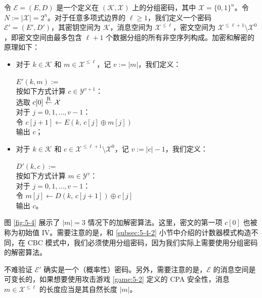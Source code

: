 令 $\mathcal{E}=(E,D)$ 是一个定义在 $(\mathcal{K},\mathcal{X})$ 上的分组密码，其中 $\mathcal{X}=\{0,1\}^n$。令 $N:=|\mathcal{X}|=2^n$。对于任意多项式边界的 $\ell\geq1$，我们定义一个密码 $\mathcal{E}'=(E',D')$，其密钥空间为 $\mathcal{K}$，消息空间为 $\mathcal{X}^{\leq\ell}$，密文空间为 $\mathcal{X}^{\leq\ell+1}\setminus\mathcal{X}^0$，即密文空间由最多包含 $\ell+1$ 个数据分组的所有非空序列构成。加密和解密的原理如下：
\begin{itemize}
	\item 对于 $k\in\mathcal{K}$ 和 $m\in\mathcal{X}^{\leq\ell}$，记 $v:=|m|$，我们定义：
	
	\hspace*{20pt} $E'(k,m):=$\\
	\hspace*{50pt} 按如下方式计算 $c\in\mathcal{Y}^{v+1}$：\\
	\hspace*{75pt} 选取 $c[0]\overset{\rm R}\leftarrow\mathcal{X}$\\
	\hspace*{75pt} 对于 $j=0,1,\dots,v-1$：\\
	\hspace*{100pt} 令 $c[j+1]\leftarrow E(k,\,c[j]\oplus m[j])$\\
	\hspace*{50pt} 输出 $c$；
	\item 对于 $k\in\mathcal{K}$ 和 $c\in\mathcal{X}^{\leq\ell+1}\setminus\mathcal{X}^0$，记 $v:=|c|-1$，我们定义：
	
	\hspace*{20pt} $D'(k,c):=$\\
	\hspace*{50pt} 按如下方式计算 $m\in\mathcal{Y}^{v}$：\\
	\hspace*{75pt} 对于 $j=0,1,\dots,v-1$：\\
	\hspace*{100pt} 令 $m[j]\leftarrow D(k,\,c[j+1])\oplus c[j]$\\
	\hspace*{50pt} 输出 $c$。
\end{itemize}

图 \ref{fig:5-4} 展示了 $|m|=3$ 情况下的加解密算法。这里，密文的第一项 $c[0]$ 也被称为初始值 IV。需要注意的是，和 \ref{subsec:5-4-2} 小节中介绍的计数器模式构造不同，在 CBC 模式中，我们必须使用分组密码，因为我们实际上需要使用分组密码的解密算法。

不难验证 $\mathcal{E}'$ 确实是一个（概率性）密码。另外，需要注意的是，$\mathcal{E}$ 的消息空间是可变长的，如果想要使用攻击游戏 \ref{game:5-2} 定义的 CPA 安全性，消息 $m\in\mathcal{X}^{\leq\ell}$ 的长度应当是其自然长度 $|m|$。

